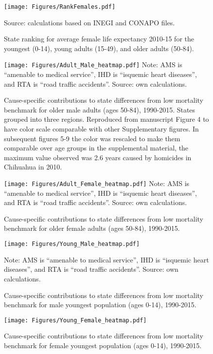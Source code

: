 \documentclass[11.5pt]{article}
\begin{document}
{\begin{figure}[h!]
\centering
\caption{State ranking for average female life expectancy 2010-15 for the youngest (0-14), young adults (15-49), and older adults (50-84).}
\label{rankFemales}
\texttt{[image: Figures/RankFemales.pdf]}

Source: calculations based on INEGI and CONAPO files. 
\end{figure}

\begin{figure}[h!]
\centering
\caption{Cause-specific contributions to state differences from low mortality benchmark for older male adults (ages 50-84), 1990-2015. States grouped into three regions. Reproduced from manuscript Figure 4 to have color scale comparable with other Supplementary figures. In subsequent figures 5-9 the color was rescaled to make them comparable over age groups in the supplemental material, the maximum value observed was 2.6 years caused by homicides in Chihuahua in 2010.}
\label{fig:e40_74_males}
\texttt{[image: Figures/Adult\_Male\_heatmap.pdf]}
Note: AMS is ``amenable to medical service'', IHD is ``isquemic heart diseases'', and RTA is ``road traffic accidents''. Source: own calculations. \end{figure}

\begin{figure}[h!]
\centering
\caption{Cause-specific contributions to state differences from low mortality benchmark for older female adults (ages 50-84), 1990-2015.}
\label{fig:e40_74_females}
\texttt{[image: Figures/Adult\_Female\_heatmap.pdf]}
Note: AMS is ``amenable to medical service'', IHD is ``isquemic heart diseases'', and RTA is ``road traffic accidents''. Source: own calculations. \end{figure}


\begin{figure}
\centering
\caption{Cause-specific contributions to state differences from low mortality benchmark for male youngest population (ages 0-14), 1990-2015.}
\label{fig:e0_14_males}
\texttt{[image: Figures/Young\_Male\_heatmap.pdf]}

Note: AMS is ``amenable to medical service'', IHD is ``isquemic heart diseases'', and RTA is ``road traffic accidents''. Source: own calculations.\end{figure}

\begin{figure}
\centering
\caption{Cause-specific contributions to state differences from low mortality benchmark for female youngest population (ages 0-14), 1990-2015.} 
\label{fig:e0_14_females}
\texttt{[image: Figures/Young\_Female\_heatmap.pdf]}


\end{figure}}
\end{document}
